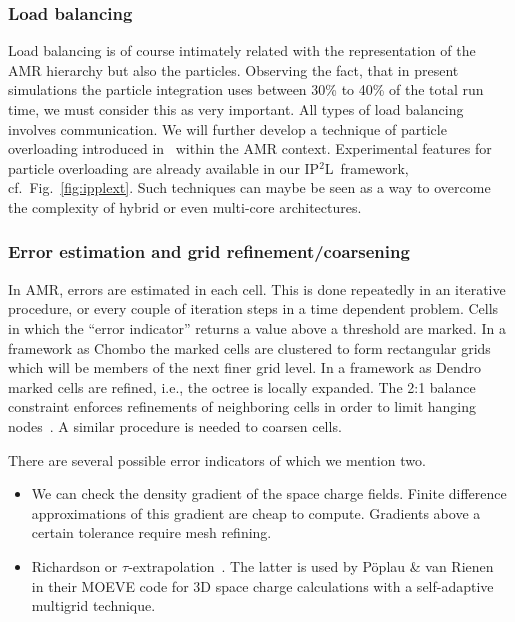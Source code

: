 \documentclass[11pt,pdftex]{article}
\renewcommand{\ippl}{\textsc{IP$^{2}$L}}
\begin{document}
\subsubsection{Load balancing}

Load balancing is of course intimately related with the representation
of the AMR hierarchy but also the particles.  Observing the fact, that
in present simulations the particle integration uses between 30\% to
40\% of the total run time, we must consider this as very important.
All types of load balancing involves communication.  We will further
develop a technique of particle overloading introduced
in~\cite{habib2009} within the AMR context.  Experimental features for
particle overloading are already available in our \ippl\ framework,
cf.~Fig.~\ref{fig:ipplext}.  Such techniques can maybe be seen as a way
to overcome the complexity of hybrid or even multi-core architectures.

\subsubsection{Error estimation and grid refinement/coarsening}

In AMR, errors are estimated in each cell.  This is done repeatedly in
an iterative procedure, or every couple of iteration steps in a time
dependent problem.  Cells in which the ``error indicator'' returns a
value above a threshold are marked.  In a framework as \textsf{Chombo}
the marked cells are clustered to form rectangular grids which will be
members of the next finer grid level.  In a framework as \textsf{Dendro}
marked cells are refined, i.e., the octree is locally expanded.  The 2:1
balance constraint enforces refinements of neighboring cells in order to
limit hanging nodes~\cite{sasl:08}.  A similar procedure is needed to
coarsen cells.

There are several possible error indicators of which we mention two.
\begin{itemize}
\item We can check the density gradient of the space charge fields.
  Finite difference approximations of this gradient are cheap to
  compute.   Gradients above a certain tolerance require mesh refining. 
\item Richardson or $\tau$-extrapolation~\cite{tros:00}.  The latter is
  used by P\"oplau \& van Rienen~\cite{pori2008} in their MOEVE code for
  3D space charge calculations with a self-adaptive multigrid technique.
\end{itemize}
\end{document}
